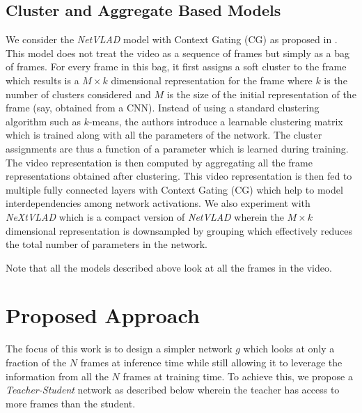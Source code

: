 \documentclass[10pt,twocolumn,letterpaper]{article}
\begin{document}
\subsection{Cluster and Aggregate Based Models}
We consider the \textit{NetVLAD} model with Context Gating (CG) as proposed in \cite{willow}. This model does not treat the video as a sequence of frames but simply as a bag of frames. For every frame in this bag, it first assigns a soft cluster to the frame which results is a $M \times k$ dimensional representation for the frame where $k$ is the number of clusters considered and $M$ is the size of the initial representation of the frame (say, obtained from a CNN). Instead of using a standard clustering algorithm such as $k$-means, the authors introduce a learnable clustering matrix which is trained along with all the parameters of the network. The cluster assignments are thus a function of a parameter which is learned during training. The video representation is then computed by aggregating all the frame representations obtained after clustering. This video representation is then fed to multiple fully connected layers with Context Gating (CG) which help to model interdependencies among network activations. We also experiment with \textit{NeXtVLAD} \cite{paper3} which is a compact version of \textit{NetVLAD} wherein the $M \times k$ dimensional representation is downsampled by grouping which effectively reduces the total number of parameters in the network.

Note that all the models described above look at all the frames in the video.

\section{Proposed Approach}\label{sec-approach}
The focus of this work is to design a simpler network $g$ which looks at only a fraction of the $N$ frames at inference time while still allowing it to leverage the information from all the $N$ frames at training time. To achieve this, we propose a \textit{Teacher-Student} network as described below wherein the teacher has access to more frames than the student.
\end{document}
